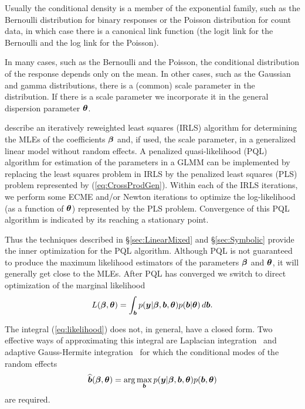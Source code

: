 \documentclass[12pt]{article}
\begin{document}
Usually the conditional density is a member of the exponential family,
such as the Bernoulli distribution for binary responses or the Poisson
distribution for count data, in which case there is a canonical link function
(the logit link for the Bernoulli and the log link for the Poisson).

In many cases, such as the Bernoulli and the Poisson, the conditional
distribution of the response depends only on the mean.  In other
cases, such as the Gaussian and gamma distributions, there is a
(common) scale parameter in the distribution.  If there is a scale
parameter we incorporate it in the general dispersion parameter $\bm{\theta}$.

\citet{mccullagh:nelder:1989} describe an iteratively reweighted least
squares (IRLS) algorithm for determining the MLEs of the coefficients
$\bm{\beta}$ and, if used, the scale parameter, in a generalized linear
model without random effects.  A penalized quasi-likelihood (PQL)
algorithm for estimation of the parameters in a GLMM can be
implemented by replacing the least squares problem in IRLS by the penalized
least squares (PLS) problem represented by (\ref{eq:CrossProdGen}).
Within each of the IRLS iterations, we perform some ECME and/or Newton
iterations to optimize the log-likelihood (as a function of $\bm{\theta}$)
represented by the PLS problem.  Convergence of this PQL algorithm is
indicated by its reaching a stationary point.

Thus the techniques described in \S\ref{sec:LinearMixed} and
\S\ref{sec:Symbolic} provide the inner optimization for the PQL
algorithm.  Although PQL is not guaranteed to produce the maximum
likelihood estimators of the parameters $\bm{\beta}$ and $\bm{\theta}$, it
will generally get close to the MLEs.  After PQL has converged we
switch to direct optimization of the marginal likelihood
\begin{equation}
  \label{eq:likelihood}
  L(\bm{\beta},\bm{\theta})=\int_{\bm{b}} p(\bm{y}|\bm{\beta},\bm{b},\bm{\theta})
  p(\bm{b}|\bm{\theta})\,d\bm{b} .
\end{equation}

The integral (\ref{eq:likelihood}) does not, in general, have a closed
form.  Two effective ways of approximating this integral are Laplacian
integration~\citep{tier:kada:1986} and adaptive Gauss-Hermite
integration~\citep{pinh:bate:2000} for which the conditional modes of
the random effects
\begin{equation}
  \label{eq:CondModes}
  \widehat{\bm{b}}(\bm{\beta},\bm{\theta})=
  \arg\max_{\bm{b}} p(\bm{y}|\bm{\beta},\bm{b},\bm{\theta})p(\bm{b},\bm{\theta})
\end{equation}
are required.
\end{document}
